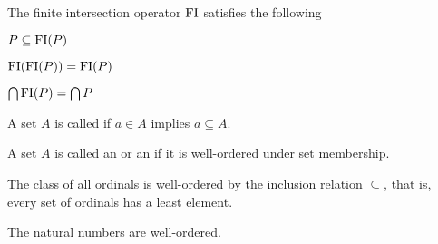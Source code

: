 \begin{proposition}\label{thm:finite_intersection_properties}
  The finite intersection operator \( \operatorname{FI} \) satisfies the following
  \begin{defenum}
    \item \( P \subseteq \operatorname{FI}(P) \)
    \item \( \operatorname{FI}(\operatorname{FI}(P)) = \operatorname{FI}(P) \)
    \item \( \bigcap \operatorname{FI}(P) = \bigcap P \)
  \end{defenum}
\end{proposition}

\begin{definition}\label{def:transitive_set}\cite[71]{Enderton1977}
  A set \( A \) is called  if \( a \in A \) implies \( a \subseteq A \).
\end{definition}

\begin{definition}\label{def:ordinal}\cite[theorem 7L]{Enderton1977}
  A set \( A \) is called an  or an  if it is well-ordered under set membership.
\end{definition}

\begin{theorem}\label{thm:ordinals_are_well_ordered}\cite[theorem 7M]{Enderton1977}
  The class of all ordinals is well-ordered by the inclusion relation \( \subseteq \), that is, every set of ordinals has a least element.
\end{theorem}

\begin{corollary}\label{thm:natural_numbers_are_well_ordered}
  The natural numbers are well-ordered.
\end{corollary}

